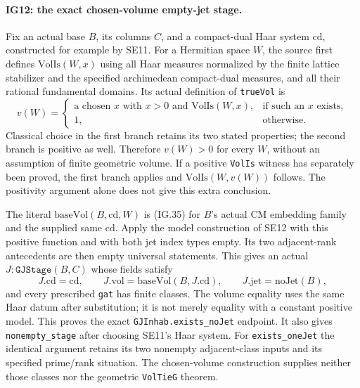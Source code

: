 \paragraph{IG12: the exact chosen-volume empty-jet stage.}
Fix an actual base $B$, its columns $C$, and a compact-dual Haar
system $\mathrm{cd}$, constructed for example by SE11.
For a Hermitian space $W$, the source first defines
$\mathrm{VolIs}(W,x)$ using all Haar measures normalized by
the finite lattice stabilizer and the specified archimedean
compact-dual measures, and all their rational fundamental
domains. Its actual definition of \texttt{trueVol} is
\[
 v(W)=
 \begin{cases}
 \text{a chosen }x\text{ with }x>0\text{ and }\mathrm{VolIs}(W,x),
                    &\text{if such an }x\text{ exists},\\
 1,                 &\text{otherwise}.
 \end{cases}                                                   \tag{IG.35}
\]
Classical choice in the first branch retains its two stated
properties; the second branch is positive as well. Therefore
$v(W)>0$ for every $W$, without an assumption of finite
geometric volume. If a positive \texttt{VolIs} witness has
separately been proved, the first branch applies and
$\mathrm{VolIs}(W,v(W))$ follows. The positivity argument alone
does not give this extra conclusion.

The literal $\mathrm{baseVol}(B,\mathrm{cd},W)$ is (IG.35) for
$B$'s actual CM embedding family and the supplied same
$\mathrm{cd}$. Apply the model construction of SE12 with this
positive function and with both jet index types empty.
Its two adjacent-rank antecedents are then empty universal
statements. This gives an actual $J:\texttt{GJStage}(B,C)$
whose fields satisfy
\[
  J.\mathrm{cd}=\mathrm{cd},\qquad
  J.\mathrm{vol}=\mathrm{baseVol}(B,J.\mathrm{cd}),\qquad
  J.\mathrm{jet}=\mathrm{noJet}(B),
                                                               \tag{IG.36}
\]
and every prescribed \texttt{gat} has finite classes.
The volume equality uses the same Haar datum after substitution;
it is not merely equality with a constant positive model.
This proves the exact \texttt{GJInhab.exists\_noJet} endpoint.
It also gives \texttt{nonempty\_stage} after choosing SE11's
Haar system. For \texttt{exists\_oneJet} the identical argument
retains its two nonempty adjacent-class inputs and its specified
prime/rank situation. The chosen-volume construction supplies
neither those classes nor the geometric \texttt{VolTieG} theorem.

